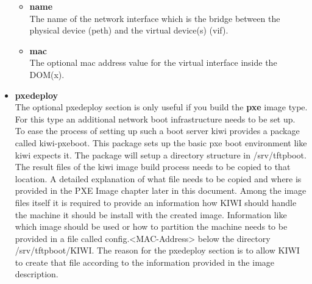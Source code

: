 \begin{itemize}
	\begin{itemize}
	\item \textbf{name}\\
      The name of the network interface which is the bridge between
      the physical device (peth) and the virtual device(s) (vif).
	\item \textbf{mac}\\
      The optional mac address value for the virtual interface inside
      the DOM(x).
	\end{itemize}

\item \textbf{pxedeploy}\\
	The optional pxedeploy section is only useful if you build the \textbf{pxe}
	image type. For this type an additional network boot infrastructure needs
	to be set up. To ease the process of setting up such a boot server kiwi
	provides a package called kiwi-pxeboot. This package sets up the basic
	pxe boot environment like kiwi expects it. The package will setup a
	directory structure in /srv/tftpboot. The result files of the kiwi
	image build process needs to be copied to that location. A detailed
	explanation of what file needs to be copied and where is provided in
	the PXE Image chapter later in this document. Among the image files itself
	it is required to provide an information how KIWI should handle the
	machine it should be install with the created image. Information like
	which image should be used or how to partition the machine needs to
	be provided in a file called config.<MAC-Address> below the directory
	/srv/tftpboot/KIWI. The reason for the pxedeploy section is to allow KIWI
	to create that file according to the information provided in the image
	description.


\end{itemize}
